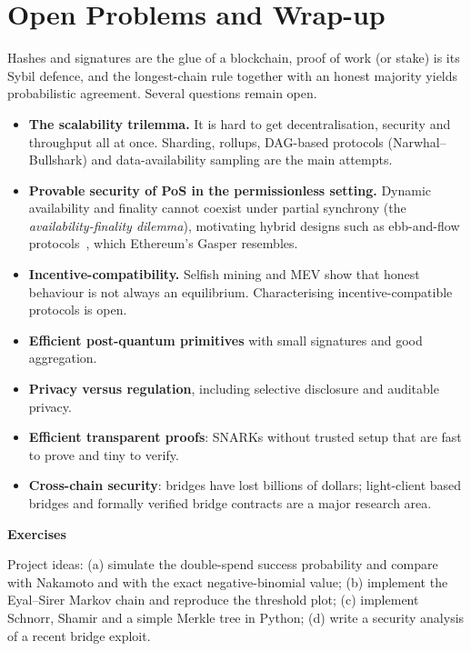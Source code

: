 \documentclass[11pt,a4paper]{article}
\newenvironment{plainenglish}{\par\smallskip}{\par\smallskip}
\newenvironment{exercisebox}{\par\medskip\noindent\textbf{Exercises}\par\nopagebreak\smallskip}{\par\medskip}
\theoremstyle{definition}
\theoremstyle{plain}
\theoremstyle{remark}
\begin{document}
\section{Open Problems and Wrap-up}\label{sec:open}

\begin{plainenglish}
Hashes and signatures are the glue of a blockchain, proof of work (or stake) is its Sybil defence, and the longest-chain rule together with an honest majority yields probabilistic agreement. Several questions remain open.
\end{plainenglish}

\begin{itemize}
\item \textbf{The scalability trilemma.} It is hard to get decentralisation, security and throughput all at once. Sharding, rollups, DAG-based protocols (Narwhal--Bullshark) and data-availability sampling are the main attempts.
\item \textbf{Provable security of PoS in the permissionless setting.} Dynamic availability and finality cannot coexist under partial synchrony (the \emph{availability-finality dilemma}), motivating hybrid designs such as ebb-and-flow protocols~\cite{Neu21}, which Ethereum's Gasper resembles.
\item \textbf{Incentive-compatibility.} Selfish mining and MEV show that honest behaviour is not always an equilibrium. Characterising incentive-compatible protocols is open.
\item \textbf{Efficient post-quantum primitives} with small signatures and good aggregation.
\item \textbf{Privacy versus regulation}, including selective disclosure and auditable privacy.
\item \textbf{Efficient transparent proofs}: SNARKs without trusted setup that are fast to prove and tiny to verify.
\item \textbf{Cross-chain security}: bridges have lost billions of dollars; light-client based bridges and formally verified bridge contracts are a major research area.
\end{itemize}

\begin{exercisebox}
Project ideas: (a) simulate the double-spend success probability and compare with Nakamoto and with the exact negative-binomial value; (b) implement the Eyal--Sirer Markov chain and reproduce the threshold plot; (c) implement Schnorr, Shamir and a simple Merkle tree in Python; (d) write a security analysis of a recent bridge exploit.
\end{exercisebox}
\end{document}
